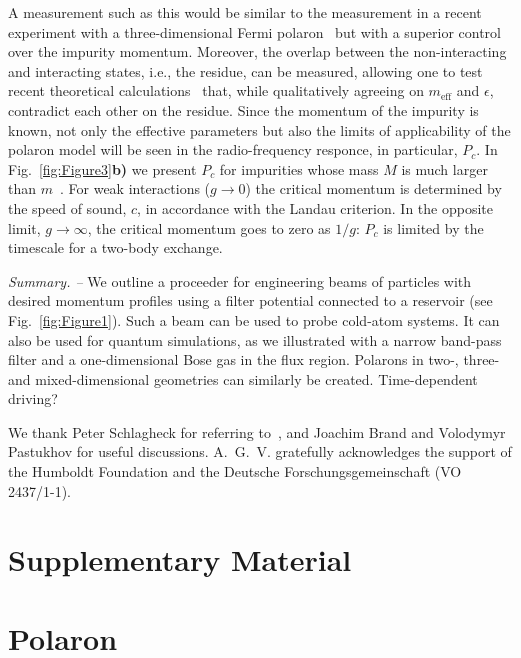 \documentclass[twocolumn,amsmath,amssymb,showpacs,prl,superscriptaddress,aps]{revtex4-1}
\begin{document}
A measurement such as this would be similar to the measurement in a recent experiment with a three-dimensional Fermi polaron~\cite{zaccanti2017} but 
with a superior control over the impurity momentum. 
Moreover, the overlap between the non-interacting and interacting states, i.e., the residue, can
be measured, allowing one to test recent theoretical calculations~\cite{volosniev2017, pastukhov2017,grusdt2017,pastukhov2018}
that, while qualitatively agreeing on $m_{\mathrm{eff}}$ and $\epsilon$, contradict each other on the residue.
Since the momentum of the impurity is known, not only the effective parameters but also the limits of applicability 
of the polaron model will be seen in the radio-frequency responce, in particular, $P_c$.
In Fig.~\ref{fig:Figure3}{\bf b)} we present $P_c$ for impurities whose mass $M$ is much larger than $m$~\cite{hakim1997}.
For weak interactions ($g\to 0$) the critical momentum is determined by the speed of sound, $c$, in accordance with the Landau criterion.
In the opposite limit, $g\to \infty$, the critical momentum goes to zero as $1/g$:   
$P_c$ is limited by the timescale for a two-body exchange. 
 



{\it Summary. --}  We outline a proceeder for engineering beams of particles with desired momentum profiles using a filter potential connected to a reservoir (see Fig.~\ref{fig:Figure1}). Such a beam can be used to probe cold-atom systems. It can also be used for quantum simulations, as we illustrated with a narrow band-pass filter and a one-dimensional Bose gas in the flux region. Polarons in two-, three- and mixed-dimensional geometries can similarly be created. {\color{red} Time-dependent driving?} 



\begin{acknowledgments}
We thank Peter Schlagheck for referring to~\cite{Schlagheck2005},
and Joachim Brand and Volodymyr Pastukhov for useful discussions.
A.~G.~V. gratefully acknowledges the support of the Humboldt Foundation and the Deutsche Forschungsgemeinschaft
(VO 2437/1-1).
\end{acknowledgments}

\widetext

\section{Supplementary Material}

\section{Polaron}
\end{document}
